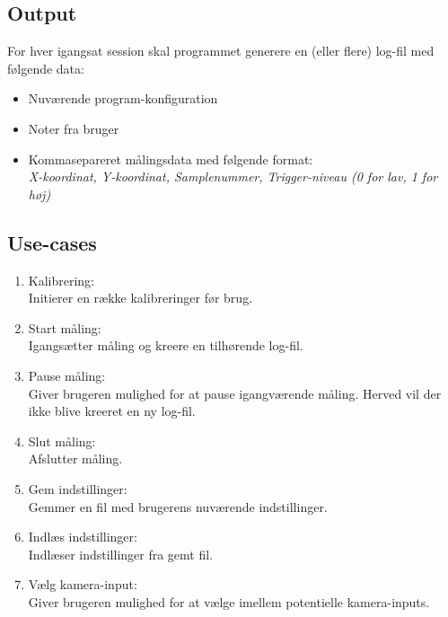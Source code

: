\documentclass[kravspec.tex]{subfiles}
\begin{document}
\subsection{Output}
For hver igangsat session skal programmet generere en (eller flere) log-fil med følgende data:
\indent \begin{itemize}
	\item Nuværende program-konfiguration
	\item Noter fra bruger
	\item 	Kommasepareret målingsdata med følgende format: \\
	\textit{X-koordinat, Y-koordinat, Samplenummer, Trigger-niveau (0 for lav, 1 for høj)} 
\end{itemize}

\subsection{Use-cases}	
\label{usec}
\begin{enumerate}
	\item Kalibrering: \\Initierer en række kalibreringer før brug. 
	\item Start måling: \\Igangsætter måling og kreere en tilhørende log-fil.
	\item Pause måling: \\Giver brugeren mulighed for at pause igangværende måling. Herved vil der ikke blive kreeret en ny log-fil. 
	\item Slut måling: \\Afslutter måling.
	\item Gem indstillinger: \\Gemmer en fil med brugerens nuværende indstillinger.
	\item Indlæs indstillinger: \\Indlæser indstillinger fra gemt fil.
	\item Vælg kamera-input: \\ Giver brugeren mulighed for at vælge imellem potentielle kamera-inputs.

\end{enumerate}
	
\end{document}
